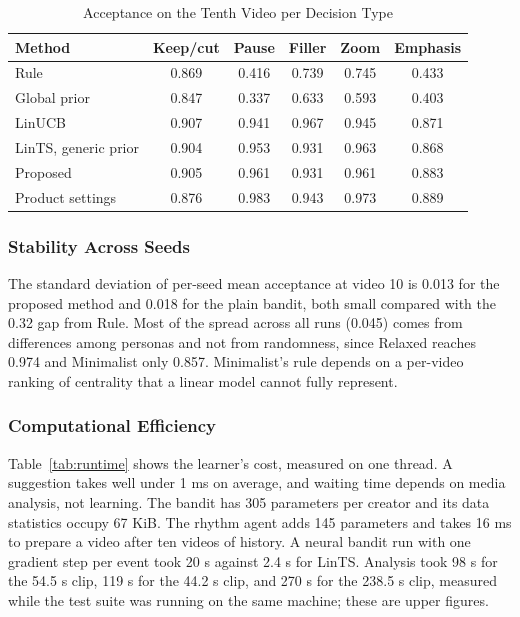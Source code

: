 \documentclass{ieeeaccess}
\begin{document}
\begin{table}[t]
\caption{Acceptance on the Tenth Video per Decision Type}
\label{tab:type}
\setlength{\tabcolsep}{3pt}
\centering
\begin{tabular}{|l|c|c|c|c|c|}
\hline
Method & Keep/cut & Pause & Filler & Zoom & Emphasis \\
\hline
Rule & 0.869 & 0.416 & 0.739 & 0.745 & 0.433 \\
Global prior & 0.847 & 0.337 & 0.633 & 0.593 & 0.403 \\
LinUCB & 0.907 & 0.941 & 0.967 & 0.945 & 0.871 \\
LinTS, generic prior & 0.904 & 0.953 & 0.931 & 0.963 & 0.868 \\
Proposed & 0.905 & 0.961 & 0.931 & 0.961 & 0.883 \\
Product settings & 0.876 & 0.983 & 0.943 & 0.973 & 0.889 \\
\hline
\end{tabular}
\end{table}

\subsubsection{Stability Across Seeds}
The standard deviation of per-seed mean acceptance at video 10 is 0.013 for the proposed method and 0.018 for the plain bandit, both small compared with the 0.32 gap from Rule. Most of the spread across all runs (0.045) comes from differences among personas and not from randomness, since Relaxed reaches 0.974 and Minimalist only 0.857. Minimalist's rule depends on a per-video ranking of centrality that a linear model cannot fully represent.

\subsubsection{Computational Efficiency}
Table~\ref{tab:runtime} shows the learner's cost, measured on one thread. A suggestion takes well under 1 ms on average, and waiting time depends on media analysis, not learning. The bandit has 305 parameters per creator and its data statistics occupy 67 KiB. The rhythm agent adds 145 parameters and takes 16 ms to prepare a video after ten videos of history. A neural bandit run with one gradient step per event took 20 s against 2.4 s for LinTS. Analysis took 98 s for the 54.5 s clip, 119 s for the 44.2 s clip, and 270 s for the 238.5 s clip, measured while the test suite was running on the same machine; these are upper figures.
\end{document}

